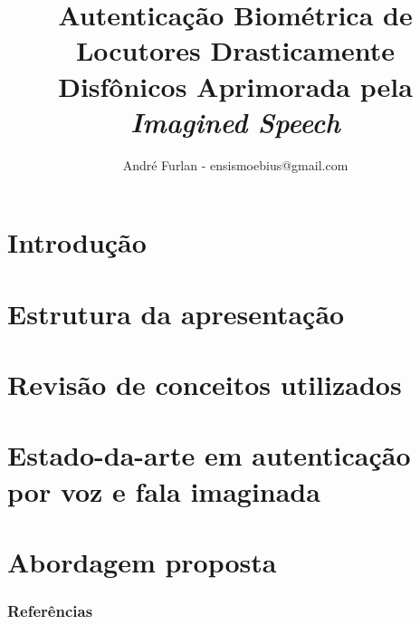 

\title{Autenticação Biométrica de Locutores Drasticamente Disfônicos Aprimorada pela \textit{Imagined Speech}}


\author{André Furlan - ensismoebius@gmail.com}

\date{\the\year}


	
	\frame{\titlepage}
	
	\section{Introdução}
		

	\section{Estrutura da apresentação}
		

	\section{Revisão de conceitos utilizados}
		
		
		
		
		
		
		
		
		
		
		
	
	\section{Estado-da-arte em autenticação por voz e fala imaginada}
		

	\section{Abordagem proposta}
		
		
	
	\begin{frame}[allowframebreaks]
		\frametitle{Referências}
		
	\end{frame}
	
